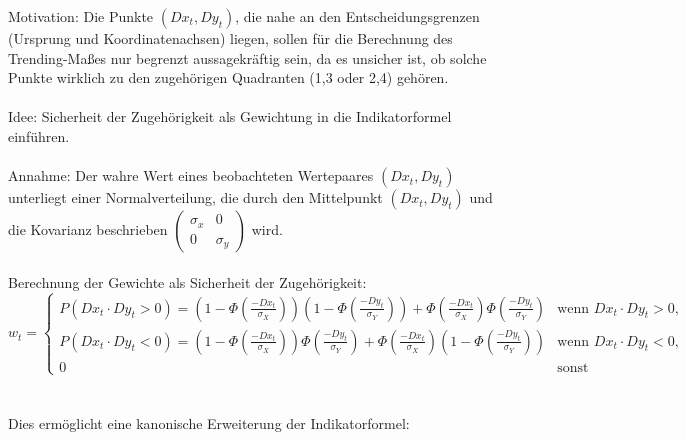 \documentclass[oneside]{article}
\theoremstyle{plain}%
\theoremstyle{definition}
\begin{document}
Motivation: Die Punkte $(Dx_t, Dy_t)$, die nahe an den Entscheidungsgrenzen (Ursprung und Koordinatenachsen) liegen, sollen für die Berechnung des Trending-Maßes nur begrenzt aussagekräftig sein, da es unsicher ist, ob solche Punkte wirklich zu den zugehörigen Quadranten (1,3 oder 2,4) gehören.\\\\
Idee: Sicherheit der Zugehörigkeit als Gewichtung in die Indikatorformel einführen.\\\\
Annahme: Der wahre Wert eines beobachteten Wertepaares $(Dx_t,Dy_t)$ unterliegt einer Normalverteilung, die durch den Mittelpunkt $(Dx_t,Dy_t)$ und die Kovarianz  beschrieben 
$\begin{pmatrix} \sigma_x & 0 \\
0 & \sigma_y 
\end{pmatrix}$ wird.\\\\
Berechnung der Gewichte als Sicherheit der Zugehörigkeit: 
\[ 
w_t = 
\begin{cases} 
  P(Dx_t \cdot Dy_t > 0) = \left(1 - \Phi\left(\frac{-Dx_t}{\sigma_X}\right)\right)\left(1 - \Phi\left(\frac{-Dy_t}{\sigma_Y}\right)\right) + \Phi\left(\frac{-Dx_t}{\sigma_X}\right) \Phi\left(\frac{-Dy_t}{\sigma_Y}\right) & \text{wenn } Dx_t \cdot Dy_t > 0,  \\
  P(Dx_t \cdot Dy_t < 0) = \left(1 - \Phi\left(\frac{-Dx_t}{\sigma_X}\right)\right) \Phi\left(\frac{-Dy_t}{\sigma_Y}\right) + \Phi\left(\frac{-Dx_t}{\sigma_X}\right) \left(1 - \Phi\left(\frac{-Dy_t}{\sigma_Y}\right)\right)  & \text{wenn } Dx_t \cdot Dy_t < 0,  \\
  0 & \text{sonst} 
\end{cases}
\]\\\\
Dies ermöglicht eine kanonische Erweiterung der Indikatorformel: 
\end{document}
